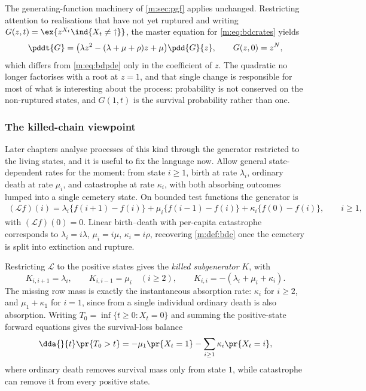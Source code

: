 The generating-function machinery of \cref{m:sec:pgf} applies unchanged. Restricting
attention to realisations that have not yet ruptured and writing
$G(z,t) = \ex{z^{X_t}\ind\{X_t\neq\dagger\}}$, the master equation for
\cref{m:eq:bdcrates} yields
\begin{equation}
\label{m:eq:bdcpde}
\pddt{G} = \bigl(\lambda z^2-(\lambda+\mu+\rho)z+\mu\bigr)\pdd{G}{z},
\qquad G(z,0) = z^{N},
\end{equation}
which differs from \cref{m:eq:bdpde} only in the coefficient of $z$. The quadratic
no longer factorises with a root at $z=1$, and that single change is responsible
for most of what is interesting about the process: probability is not conserved on
the non-ruptured states, and $G(1,t)$ is the survival probability rather than one.

\subsubsection*{The killed-chain viewpoint}

Later chapters analyse processes of this kind through the generator restricted to
the living states, and it is useful to fix the language now. Allow general
state-dependent rates for the moment: from state $i\ge1$, birth at rate
$\lambda_i$, ordinary death at rate $\mu_i$, and catastrophe at rate $\kappa_i$,
with both absorbing outcomes lumped into a single cemetery state. On bounded test
functions the generator is
\begin{multline*}
(\mathcal Lf)(i)
= \lambda_i\{f(i+1)-f(i)\} + \mu_i\{f(i-1)-f(i)\}
+ \kappa_i\{f(0)-f(i)\},
\qquad i\ge1,
\end{multline*}
with $(\mathcal Lf)(0)=0$. Linear birth--death with per-capita catastrophe
corresponds to $\lambda_i=i\lambda$, $\mu_i=i\mu$, $\kappa_i=i\rho$, recovering
\cref{m:def:bdc} once the cemetery is split into extinction and rupture.

Restricting $\mathcal L$ to the positive states gives the \emph{killed
subgenerator} $K$, with
\begin{equation*}
K_{i,i+1}=\lambda_i,\qquad K_{i,i-1}=\mu_i\quad(i\ge2),
\qquad
K_{i,i}=-(\lambda_i+\mu_i+\kappa_i) .
\end{equation*}
The missing row mass is exactly the instantaneous absorption rate: $\kappa_i$ for
$i\ge2$, and $\mu_1+\kappa_1$ for $i=1$, since from a single individual ordinary
death is also absorption. Writing $T_0=\inf\{t\ge0:X_t=0\}$ and summing the
positive-state forward equations gives the survival-loss balance
\begin{equation}
\label{m:eq:survivalloss}
\dda{}{t}\pr{T_0>t}
= -\mu_1\pr{X_t=1} - \sum_{i\ge1}\kappa_i\pr{X_t=i},
\end{equation}
where ordinary death removes survival mass only from state $1$, while catastrophe
can remove it from every positive state.

